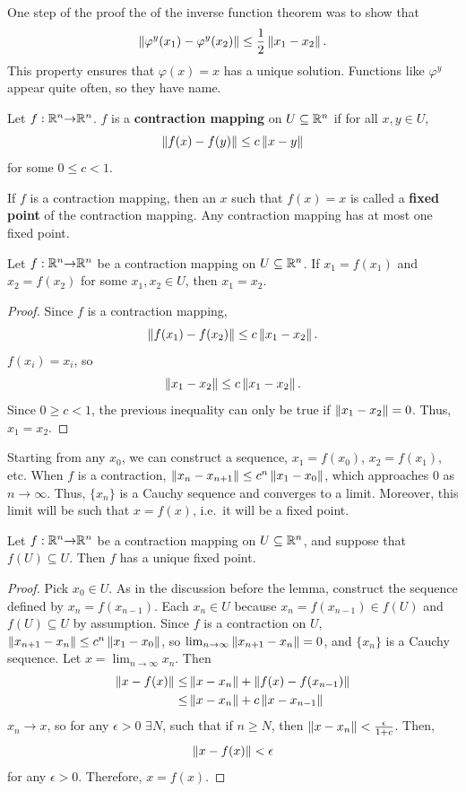 One step of the proof the of the inverse function theorem was to show that 
\[ \left\Vert {\varphi^y(x_1) - \varphi^y(x_2)} \right\Vert \leq \frac{1}{2} \left\Vert {x_1 - x_2} \right\Vert. \] 
This property ensures that $\varphi(x) = x$ has a unique
solution. Functions like $\varphi^y$ appear quite often, so they have
name.
\begin{definition}
  Let $f:\mathbb{R}^n {\rightarrow} \mathbb{R}^n$. $f$ is a \textbf{contraction mapping} on $U
  \subseteq \mathbb{R}^n$ if for all $x,y \in U$, 
  \[ \left\Vert {f(x) - f(y)} \right\Vert \leq c \left\Vert {x - y} \right\Vert \]
  for some $0 \leq c < 1$.
\end{definition}
If $f$ is a contraction mapping, then an $x$ such that $f(x) = x$ is
called a \textbf{fixed point} of the contraction mapping. Any
contraction mapping has at most one fixed point.
\begin{lemma}
  Let $f:\mathbb{R}^n {\rightarrow} \mathbb{R}^n$ be a contraction mapping on $U \subseteq
  \mathbb{R}^n$. If $x_1 = f(x_1)$ and $x_2 = f(x_2)$ for some $x_1, x_2 \in
  U$, then $x_1 = x_2$.
\end{lemma}
\begin{proof}
  Since $f$ is a contraction mapping, 
  \[ \left\Vert {f(x_1) - f(x_2)} \right\Vert \leq c \left\Vert {x_1 - x_2} \right\Vert. \]
  $f(x_i) = x_i$, so
  \[ \left\Vert {x_1 - x_2} \right\Vert \leq c \left\Vert {x_1 - x_2} \right\Vert. \]
  Since $0 \geq c < 1$, the previous inequality can only be true if
  $\left\Vert {x_1 - x_2} \right\Vert = 0$. Thus, $x_1 = x_2$.
\end{proof}
Starting from any $x_0$, we can construct a sequence, $x_1 = f(x_0)$,
$x_2 = f(x_1)$, etc. When $f$ is a contraction, $\left\Vert {x_n - x_{n+1}} \right\Vert
\leq c^n \left\Vert {x_1 - x_0} \right\Vert$, which approaches $0$ as $n \to
\infty$. Thus, $\{x_n\}$ is a Cauchy sequence and converges to a
limit. Moreover, this limit will be such that $x = f(x)$, i.e.\ it
will be a fixed point. 
\begin{lemma}
  Let $f: \mathbb{R}^n {\rightarrow} \mathbb{R}^n$ be a contraction mapping on $U \subseteq
  \mathbb{R}^n$, and suppose that $f(U) \subseteq U$.  Then $f$ has a unique
  fixed point.
\end{lemma}
\begin{proof}
  Pick $x_0 \in U$. As in the discussion before the lemma, construct
  the sequence defined by $x_n = f(x_{n-1})$. Each $x_n \in U$ because
  $x_n = f(x_{n-1}) \in f(U)$ and $f(U) \subseteq U$ by
  assumption. Since $f$ is a contraction on $U$, $\left\Vert {x_{n+1} - x_{n}} \right\Vert
  \leq c^n \left\Vert {x_1 - x_0} \right\Vert$, so $\lim_{n {\rightarrow} \infty} \left\Vert {x_{n+1} -
    x_{n}} \right\Vert = 0$, and $\{x_n\}$ is a Cauchy sequence. Let $x = \lim_{n
    \to \infty} x_n$. Then 
  \begin{align*}
    \left\Vert {x - f(x)} \right\Vert \leq & \left\Vert {x - x_n} \right\Vert + \left\Vert {f(x) - f(x_{n-1})} \right\Vert \\
    \leq & \left\Vert {x - x_n} \right\Vert + c\left\Vert {x - x_{n-1}} \right\Vert
  \end{align*}
  $x_n \to x$, so for any $\epsilon > 0$ $\exists N$, such that if $n
  \geq N$, then $\left\Vert {x - x_n} \right\Vert < \frac{\epsilon}{1+c}$. Then,
  \[ \left\Vert {x - f(x)} \right\Vert < \epsilon \]
  for any $\epsilon>0$. Therefore, $x = f(x)$. 
\end{proof}


